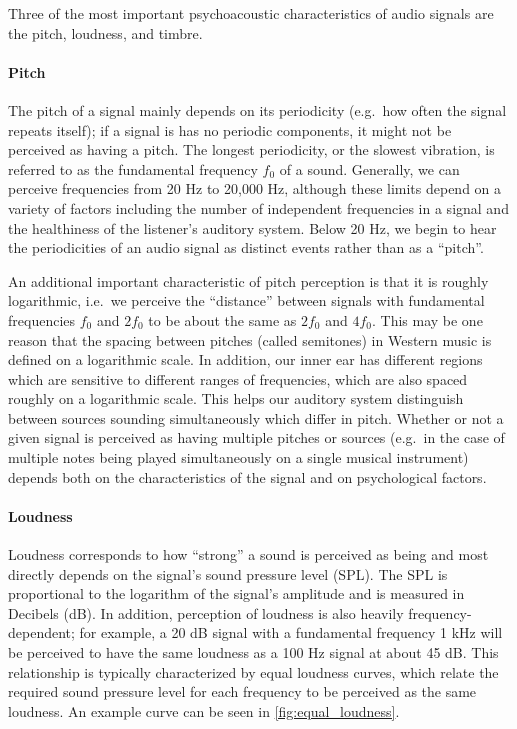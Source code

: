 Three of the most important psychoacoustic characteristics of audio signals are the pitch, loudness, and timbre.

\paragraph{Pitch}

The pitch of a signal mainly depends on its periodicity (e.g.\ how often the signal repeats itself); if a signal is has no periodic components, it might not be perceived as having a pitch.
The longest periodicity, or the slowest vibration, is referred to as the fundamental frequency $f_0$ of a sound.
Generally, we can perceive frequencies from 20 Hz to 20,000 Hz, although these limits depend on a variety of factors including the number of independent frequencies in a signal and the healthiness of the listener's auditory system.
Below 20 Hz, we begin to hear the periodicities of an audio signal as distinct events rather than as a ``pitch''.

An additional important characteristic of pitch perception is that it is roughly logarithmic, i.e.\ we perceive the ``distance'' between signals with fundamental frequencies $f_0$ and $2f_0$ to be about the same as $2f_0$ and $4f_0$.
This may be one reason that the spacing between pitches (called semitones) in Western music is defined on a logarithmic scale.
In addition, our inner ear has different regions which are sensitive to different ranges of frequencies, which are also spaced roughly on a logarithmic scale.
This helps our auditory system distinguish between sources sounding simultaneously which differ in pitch.
Whether or not a given signal is perceived as having multiple pitches or sources (e.g.\ in the case of multiple notes being played simultaneously on a single musical instrument) depends both on the characteristics of the signal and on psychological factors.

\paragraph{Loudness}

Loudness corresponds to how ``strong'' a sound is perceived as being and most directly depends on the signal's sound pressure level (SPL).
The SPL is proportional to the logarithm of the signal's amplitude and is measured in Decibels (dB).
In addition, perception of loudness is also heavily frequency-dependent; for example, a 20 dB signal with a fundamental frequency 1 kHz will be perceived to have the same loudness as a 100 Hz signal at about 45 dB.
This relationship is typically characterized by equal loudness curves, which relate the required sound pressure level for each frequency to be perceived as the same loudness.
An example curve can be seen in \cref{fig:equal_loudness}.

